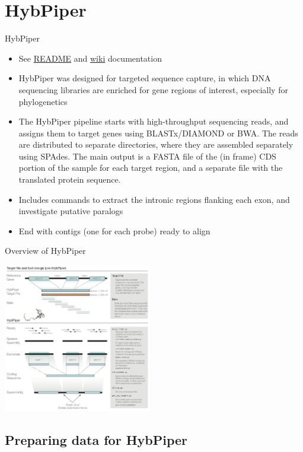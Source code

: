 \documentclass[compress, ucs, xelatex, 11pt, xcolor=x11names, aspectratio=169,
	hyperref={
		bookmarks=true,
		unicode=true,
		colorlinks=true,
		pdftitle={HybSeq course},
		plainpages=false,
		pdfauthor={Vojtech Zeisek},
		pdfsubject={Practical processing of HybSeq target enrichment sequencing data on computing grids like MetaCentrum},
		pdfcreator={XeLaTeX},
		pdfkeywords={BASH, command line, GNU, HybSeq, Linux, MetaCentrum, sequencing shell, target enrichment},
		linkcolor=Turquoise4, %
		anchorcolor=DodgerBlue4, %
		citecolor=DodgerBlue4, %
		filecolor=DodgerBlue4, %
		menucolor=Tan4, %
		urlcolor=DarkOliveGreen4, %
		pdftex},
	url={hyphens, lowtilde} %
	]{beamer}
\begin{document}
\section{HybPiper}

\begin{frame}{HybPiper}
	\begin{itemize}
		\item See \href{https://github.com/mossmatters/HybPiper\#readme}{README} and \href{https://github.com/mossmatters/HybPiper/wiki}{wiki} documentation
		\item HybPiper was designed for targeted sequence capture, in which DNA sequencing libraries are enriched for gene regions of interest, especially for phylogenetics
		\item The HybPiper pipeline starts with high-throughput sequencing reads, and assigns them to target genes using BLASTx/DIAMOND or BWA. The reads are distributed to separate directories, where they are assembled separately using SPAdes. The main output is a FASTA file of the (in frame) CDS portion of the sample for each target region, and a separate file with the translated protein sequence.
		\item Includes commands to extract the intronic regions flanking each exon, and investigate putative paralogs
		\item End with contigs (one for each probe) ready to align
	\end{itemize}
\end{frame}

\begin{frame}{Overview of HybPiper}
	\begin{center}
		\includegraphics[height=6.5cm]{hybpiper.png}
	\end{center}
\end{frame}

\subsection{Preparing data for HybPiper}
\end{document}
